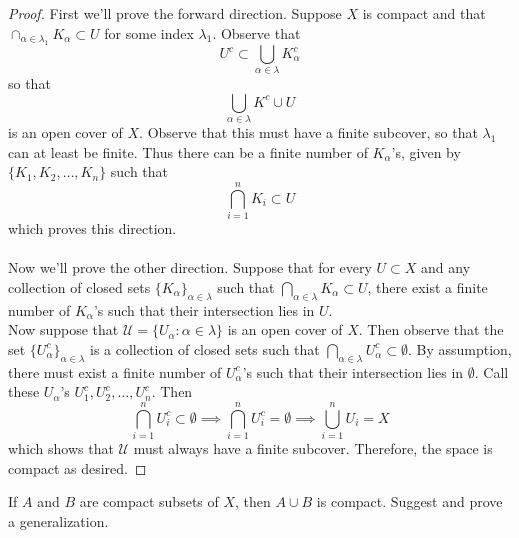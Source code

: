 \documentclass[a4paper,12pt,twoside]{hmcpset}
\begin{document}
\begin{proof}
    First we'll prove the forward direction. Suppose $X$ is compact
    and that $\cap_{\alpha \in \lambda_1} K_\alpha \subset U$ for some
    index $\lambda_1$. Observe that 
    $$
    U^c \subset \bigcup_{\alpha \in \lambda} K_\alpha^c 
    $$
    so that 
    $$
    \bigcup_{\alpha \in \lambda} K^c \cup U
    $$
    is an open cover of $X$. Observe that this must have a finite
    subcover, so that $\lambda_1$ can at least be finite. Thus there
    can be a finite number of $K_\alpha$'s, given by $\{K_1, K_2,
    \dots, K_n\}$ such that 
    $$
    \bigcap_{i = 1}^n K_i \subset U 
    $$
    which proves this direction. \\
    \\
    Now we'll prove the other direction. Suppose that for every $U
    \subset X$ and any collection of closed sets $\{K_\alpha\}_{\alpha
    \in \lambda}$ such that $\bigcap_{\alpha \in \lambda} K_\alpha
    \subset U$, there exist a finite number of $K_\alpha$'s such that
    their intersection lies in $U$. \\
    Now suppose that $\mathcal{U} = \{U_\alpha : \alpha \in \lambda\}$
    is an open cover of $X$. Then observe that the set
    $\{U^c_\alpha\}_{\alpha \in \lambda}$ is a collection of closed
    sets such that $\bigcap_{\alpha \in \lambda} U^c_\alpha \subset
    \emptyset.$ By assumption, there must exist a finite number of
    $U^c_\alpha$'s such that their intersection lies in $\emptyset$.
    Call these $U_\alpha$'s $U^c_1, U^c_2, \dots , U^c_n$. Then 
    $$
    \bigcap_{i = 1}^n U^c_i \subset \emptyset \implies \bigcap_{i = 1}^n U^c_i = \emptyset \implies \bigcup_{i = 1}^n U_i = X
    $$
    which shows that $\mathcal{U}$ must always have a finite subcover.
    Therefore, the space is compact as desired.
\end{proof}

\begin{exercise}[Exercise 7.7]
If $A$ and $B$ are compact subsets of $X$, then $A \cup B$ is compact.
Suggest and prove a generalization. 
\end{exercise}
\end{document}
